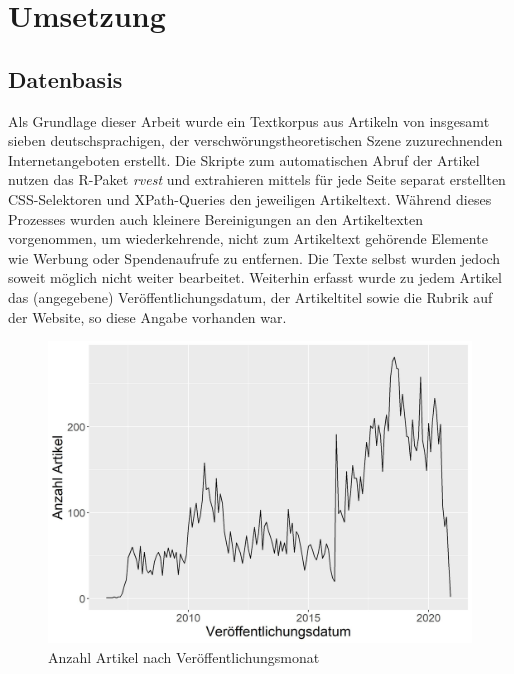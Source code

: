 \section{Umsetzung}

\subsection{Datenbasis}

Als Grundlage dieser Arbeit wurde ein Textkorpus aus Artikeln von insgesamt sieben deutschsprachigen, der verschwörungstheoretischen Szene zuzurechnenden Internetangeboten erstellt.
Die Skripte zum automatischen Abruf der Artikel nutzen das R-Paket \textit{rvest} \parencite{rvest} und extrahieren mittels für jede Seite separat erstellten CSS-Selektoren und XPath-Queries den jeweiligen Artikeltext.
Während dieses Prozesses wurden auch kleinere Bereinigungen an den Artikeltexten vorgenommen, um wiederkehrende, nicht zum Artikeltext gehörende Elemente wie Werbung oder Spendenaufrufe zu entfernen.
Die Texte selbst wurden jedoch soweit möglich nicht weiter bearbeitet.
Weiterhin erfasst wurde zu jedem Artikel das (angegebene) Veröffentlichungsdatum, der Artikeltitel sowie die Rubrik auf der Website, so diese Angabe vorhanden war.

\begin{figure}[h]
    \centering
    \includegraphics[scale=0.45]{graphics/cons_freq_time.jpg}
    \caption{Anzahl Artikel nach Veröffentlichungsmonat}
    \label{article-frequency}
\end{figure}



